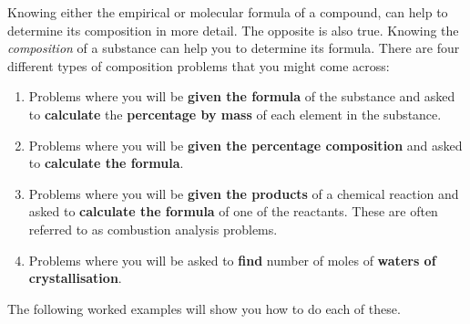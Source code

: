       \label{m38712*id280450}Knowing either the empirical or molecular formula of a compound, can help to determine its composition in more detail. The opposite is also true. Knowing the \textsl{composition} of a substance can help you to determine its formula. There are four different types of composition problems that you might come across:\par 
      \label{m38712*id280463}\begin{enumerate}[noitemsep, label=\textbf{\arabic*}. ] 
            \label{m38712*uid68}\item Problems where you will be \textbf{given the formula} of the substance and asked to \textbf{calculate} the \textbf{percentage by mass} of each element in the substance.
\label{m38712*uid69}\item Problems where you will be \textbf{given the percentage composition} and asked to \textbf{calculate the formula}.
\label{m38712*uid70}\item Problems where you will be \textbf{given the products} of a chemical reaction and asked to \textbf{calculate the formula} of one of the reactants. These are often referred to as combustion analysis problems.
\label{m38712*uid7021}\item Problems where you will be asked to \textbf{find} number of moles of \textbf{waters of crystallisation}.
\end{enumerate}
The following worked examples will show you how to do each of these.
\par
            \label{m38712*secfhsst!!!underscore!!!id901}\vspace{.5cm} 
      \noindent
